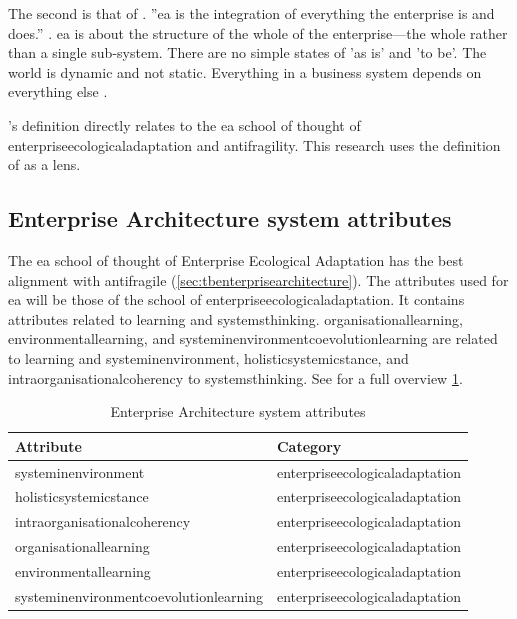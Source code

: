 The second is that of \textcite{Graves2008}. ''\acrlong{ea} is the integration of everything the enterprise is and does.'' \parencite[p.~1]{Graves2008}. \acrlong{ea} is about the structure of the whole of the enterprise—the whole rather than a single sub-system. There are no simple states of 'as is' and 'to be'. The world is dynamic and not static. Everything in a business system depends on everything else \parencite[p.~14]{Graves2008}.

\citeauthor{Graves2008}'s definition directly relates to the \acrlong{ea} school of thought of \gls{enterpriseecologicaladaptation} and \gls{antifragility}. This research uses the definition of \textcite{Graves2008} as a lens.
\subsection{Enterprise Architecture system attributes}
\label{sub:attributesonea}
The \acrlong{ea} school of thought of Enterprise Ecological Adaptation has the best alignment with \gls{antifragile} (\cref{sec:tbenterprisearchitecture}). The \glspl{attribute} used for \acrlong{ea} will be those of the school of \gls{enterpriseecologicaladaptation}.  It contains \glspl{attribute} related to learning and \gls{systemsthinking}. \Gls{organisationallearning}, \gls{environmentallearning}, and \gls{systeminenvironmentcoevolutionlearning} are related to learning and \gls{systeminenvironment}, \gls{holisticsystemicstance}, and \gls{intraorganisationalcoherency} to \gls{systemsthinking}. See for a full overview \cref{tab:attributesofeea}.
\begin{longtable}{@{}p{}p{}@{}}
	\toprule%
	\textbf{Attribute} & \textbf{Category} \\%
	\midrule%
	\endhead%
	\hline
	\endfoot%
	\caption[Enterprise Architecture system attributes]{Enterprise Architecture system attributes}
	\label{tab:attributesofeea}
	\endlastfoot%
	\Gls{systeminenvironment} & \Gls{enterpriseecologicaladaptation} \\%
	\Gls{holisticsystemicstance} & \Gls{enterpriseecologicaladaptation} \\%
	\Gls{intraorganisationalcoherency} & \Gls{enterpriseecologicaladaptation} \\%
	\Gls{organisationallearning} & \Gls{enterpriseecologicaladaptation} \\%
	\Gls{environmentallearning} & \Gls{enterpriseecologicaladaptation} \\%
	\Gls{systeminenvironmentcoevolutionlearning} & \Gls{enterpriseecologicaladaptation} \\%
	\bottomrule%
\end{longtable}